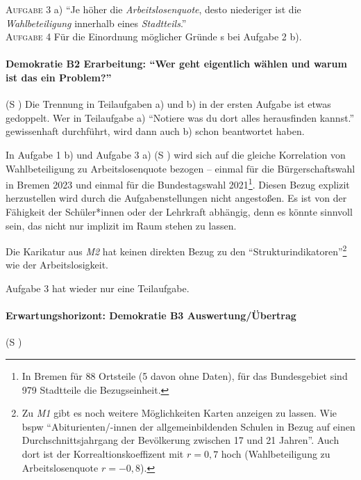 \textsc{Aufgabe 3} a) \quad
\enquote{Je höher die \emph{Arbeitslosenquote}, desto niederiger ist die \emph{Wahlbeteiligung} innerhalb eines \emph{Stadtteils}.}
\\

\textsc{Aufgabe 4} \quad
Für die Einordnung möglicher Gründe \gls{s} bei Aufgabe 2 b).



\paragraph{Demokratie B2 Erarbeitung: \enquote{Wer geht eigentlich wählen und warum ist das ein Problem?}}  (\gls{S} \pageref{DEMOKRATIE-B2})
Die Trennung in Teilaufgaben a) und b) in der ersten Aufgabe ist etwas gedoppelt. Wer in Teilaufgabe a) \enquote{Notiere was du dort alles herausfinden kannst.} gewissenhaft durchführt, wird dann auch b) schon beantwortet haben.

In Aufgabe 1 b) und Aufgabe 3 a) (\gls{S} \pageref{DEMOKRATIE-B3}) wird sich auf die gleiche Korrelation von Wahlbeteiligung zu Arbeitslosenquote bezogen
-- einmal für die Bürgerschaftswahl in Bremen 2023 und einmal für die Bundestagswahl 2021\footnote{
    In Bremen für 88 Ortsteile (5 davon ohne Daten), für das Bundesgebiet sind 979 Stadtteile die Bezugseinheit.}. 
Diesen Bezug explizit herzustellen wird durch die Aufgabenstellungen nicht angestoßen. Es ist von der Fähigkeit der Schüler*innen oder der Lehrkraft abhängig, denn es könnte sinnvoll sein, das nicht nur implizit im Raum stehen zu lassen.

Die Karikatur aus \emph{M2} hat keinen direkten Bezug zu den \enquote{Strukturindikatoren}\footnote{
    Zu \emph{M1} gibt es noch weitere Möglichkeiten Karten anzeigen zu lassen. Wie \gls{bspw} \enquote{Abiturienten/-innen der allgemeinbildenden Schulen in Bezug auf einen Durchschnittsjahrgang der Bevölkerung zwischen 17 und 21 Jahren}. Auch dort ist der Korrealtionskoeffizent mit $r = 0,7$ hoch (Wahlbeteiligung zu Arbeitslosenquote $r = -0,8$).
} wie der Arbeitslosigkeit. 

Aufgabe 3 hat wieder nur eine Teilaufgabe. 



\paragraph{Erwartungshorizont: Demokratie B3 Auswertung/Übertrag}  (\gls{S} \pageref{DEMOKRATIE-B3})

